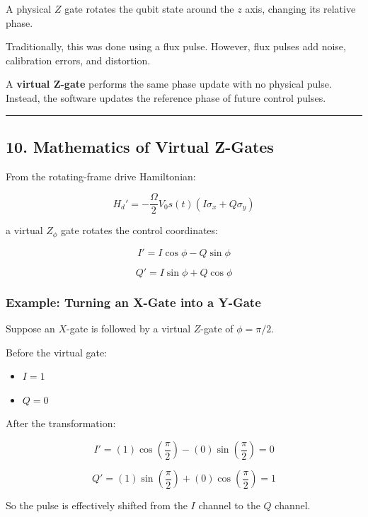 \documentclass[
]{article}
\providecommand{\tightlist}{%
  \setlength{\itemsep}{0pt}\setlength{\parskip}{0pt}}
\begin{document}
A physical \(Z\) gate rotates the qubit state around the \(z\) axis,
changing its relative phase.

Traditionally, this was done using a flux pulse. However, flux pulses
add noise, calibration errors, and distortion.

A \textbf{virtual Z-gate} performs the same phase update with no
physical pulse. Instead, the software updates the reference phase of
future control pulses.

\begin{center}\rule{0.5\linewidth}{0.5pt}\end{center}

\subsection{10. Mathematics of Virtual
Z-Gates}\label{mathematics-of-virtual-z-gates}

From the rotating-frame drive Hamiltonian:

\[
H_d' = -\frac{\Omega}{2}V_0 s(t)\left(I\sigma_x + Q\sigma_y\right)
\]

a virtual \(Z_\phi\) gate rotates the control coordinates:

\[
I' = I\cos\phi - Q\sin\phi
\]

\[
Q' = I\sin\phi + Q\cos\phi
\]

\subsubsection{Example: Turning an X-Gate into a
Y-Gate}\label{example-turning-an-x-gate-into-a-y-gate}

Suppose an \(X\)-gate is followed by a virtual \(Z\)-gate of
\(\phi = \pi/2\).

Before the virtual gate:

\begin{itemize}
\tightlist
\item
  \(I=1\)
\item
  \(Q=0\)
\end{itemize}

After the transformation:

\[
I' = (1)\cos\left(\frac{\pi}{2}\right) - (0)\sin\left(\frac{\pi}{2}\right) = 0
\]

\[
Q' = (1)\sin\left(\frac{\pi}{2}\right) + (0)\cos\left(\frac{\pi}{2}\right) = 1
\]

So the pulse is effectively shifted from the \(I\) channel to the \(Q\)
channel.
\end{document}
